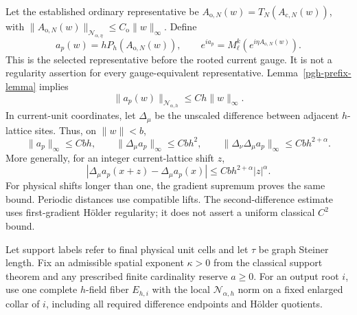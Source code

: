 Let the established ordinary representative be
$A_{\mathrm o,N}(w)=T_N(A_{\mathrm c,N}(w))$, with
$\|A_{\mathrm o,N}(w)\|_{\mathcal N_{\alpha,\eta}}
\le C_{\mathrm o}\|w\|_\infty$. Define
\begin{equation}
 a_p(w)=hP_h(A_{\mathrm o,N}(w)),\qquad
 e^{ia_p}=M_\ell^k(e^{i\eta A_{\mathrm o,N}(w)}).
 \label{pgh-pregauge}
\end{equation}
This is the selected representative before the rooted current
gauge. It is not a regularity assertion for every gauge-equivalent
representative. Lemma~\ref{pgh-prefix-lemma} implies
\begin{equation}
 \|a_p(w)\|_{\mathcal N_{\alpha,h}}
                  \le Ch\|w\|_\infty.
 \label{pgh-angle-norm}
\end{equation}
In current-unit coordinates, let $\Delta_\mu$ be the unscaled
difference between adjacent $h$-lattice sites. Thus, on $\|w\|<b$,
\begin{equation}
 \|a_p\|_\infty\le Cbh,\qquad
 \|\Delta_\mu a_p\|_\infty\le Cbh^2,\qquad
 \|\Delta_\nu\Delta_\mu a_p\|_\infty
                         \le Cbh^{2+\alpha}.
 \label{pgh-scale-bounds}
\end{equation}
More generally, for an integer current-lattice shift $z$,
\begin{equation}
 |\Delta_\mu a_p(x+z)-\Delta_\mu a_p(x)|
                  \le Cbh^{2+\alpha}|z|^\alpha.
 \label{pgh-shift-bound}
\end{equation}
For physical shifts longer than one, the gradient supremum
proves the same bound. Periodic distances use compatible lifts.
The second-difference estimate uses first-gradient H\"older
regularity; it does not assert a uniform classical $C^2$ bound.

Let support labels refer to final physical unit cells and let
$\tau$ be graph Steiner length. Fix an admissible spatial exponent
$\kappa>0$ from the classical support theorem and any prescribed
finite cardinality reserve $a\ge0$. For an output root $i$, use
one complete $h$-field fiber $E_{h,i}$ with the local
$\mathcal N_{\alpha,h}$ norm on a fixed enlarged collar of $i$,
including all required difference endpoints and H\"older quotients.

